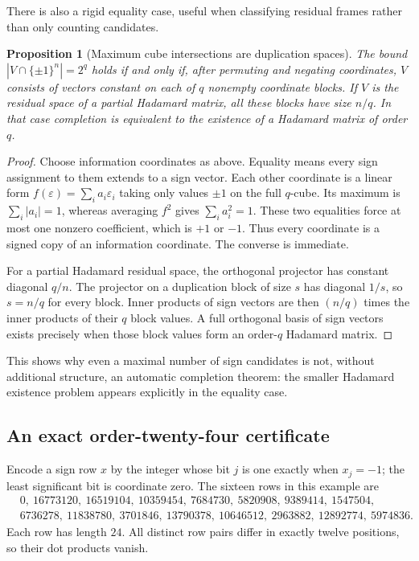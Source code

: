 \documentclass[11pt]{article}
\newtheorem{proposition}{Proposition}[section]
\begin{document}
There is also a rigid equality case, useful when classifying residual
frames rather than only counting candidates.
\begin{proposition}[Maximum cube intersections are duplication spaces]
The bound $|V\cap\{\pm1\}^n|=2^q$ holds if and only if, after
permuting and negating coordinates, $V$ consists of vectors constant
on each of $q$ nonempty coordinate blocks.
If $V$ is the residual space of a partial Hadamard matrix, all these
blocks have size $n/q$. In that case completion is equivalent to the
existence of a Hadamard matrix of order $q$.
\end{proposition}
\begin{proof}
Choose information coordinates as above. Equality means every sign
assignment to them extends to a sign vector. Each other coordinate is
a linear form $f(\varepsilon)=\sum_i a_i\varepsilon_i$ taking only
values $\pm1$ on the full $q$-cube. Its maximum is
$\sum_i|a_i|=1$, whereas averaging $f^2$ gives $\sum_i a_i^2=1$.
These two equalities force at most one nonzero coefficient, which is
$+1$ or $-1$. Thus every coordinate is a signed copy of an information
coordinate. The converse is immediate.

For a partial Hadamard residual space, the orthogonal projector has
constant diagonal $q/n$. The projector on a duplication block of size
$s$ has diagonal $1/s$, so $s=n/q$ for every block. Inner products of
sign vectors are then $(n/q)$ times the inner products of their $q$
block values. A full orthogonal basis of sign vectors exists precisely
when those block values form an order-$q$ Hadamard matrix.
\end{proof}

This shows why even a maximal number of sign candidates is not, without
additional structure, an automatic completion theorem: the smaller
Hadamard existence problem appears explicitly in the equality case.

\subsection{An exact order-twenty-four certificate}
Encode a sign row $x$ by the integer whose bit $j$ is one exactly when
$x_j=-1$; the least significant bit is coordinate zero. The sixteen
rows in this example are
\begin{align*}
 &0,\ 16773120,\ 16519104,\ 10359454,\ 7684730,\ 5820908,\ 9389414,\ 1547504,\\
 &6736278,\ 11838780,\ 3701846,\ 13790378,\ 10646512,\ 2963882,\ 12892774,\ 5974836.
\end{align*}
Each row has length $24$. All distinct row pairs differ in exactly
twelve positions, so their dot products vanish.
\end{document}
